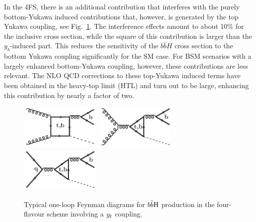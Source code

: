 \documentclass[11pt,a4paper]{article}
\begin{document}
In the 4FS, there is an additional contribution that interferes with the purely bottom-Yukawa induced contributions that, however, is generated by the top Yukawa coupling, see Fig.~\ref{fig:bbhyt}. The interference effects amount to about 10\% \cite{dittmaier:2003ej,dawson:2003kb} for the inclusive cross section, while the square of this contribution is larger than the $y_b$-induced part. This reduces the sensitivity of the $b\bar bH$ cross section to the bottom Yukawa coupling significantly for the SM case. For BSM scenarios with a largely enhanced bottom-Yukawa coupling, however, these contributions are less relevant. The NLO QCD corrections to these top-Yukawa induced terms have been obtained in the heavy-top limit (HTL) \cite{deutschmann:2018avk} and turn out to be large, enhancing this contribution by nearly a factor of two.
\begin{figure}
\begin{center}
    \includegraphics[height=2.15cm]{./diags/gg-bbH1loop2tb_4F.pdf}\hspace{1.2cm}
    \includegraphics[height=2.15cm]{./diags/gg-bbH1loop5tb.pdf}\hspace{1.2cm}
    \includegraphics[height=2.15cm]{./diags/qq-bbH1loop2tb.pdf}
  \caption{Typical one-loop Feynman diagrams for $b\bar{b}\text{H}$ production in the four-flavour scheme involving a $y_t$ coupling.}
  \label{fig:bbhyt}
\end{center}
\end{figure}
\end{document}
